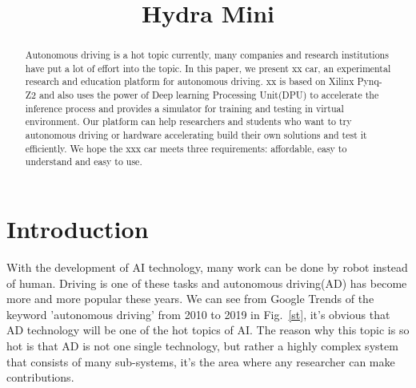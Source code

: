 \documentclass[conference]{IEEEtran}
\begin{document}
\begin{sloppypar}
\title{Hydra Mini}

\author{
}
\maketitle

\begin{abstract}
Autonomous driving is a hot topic currently, many companies and research institutions have put a lot of effort into the topic. In this paper, we present xx car, an experimental research and education platform for autonomous driving. xx is based on Xilinx Pynq-Z2 and also uses the power of Deep learning Processing Unit(DPU) to accelerate the inference process and provides a simulator for training and testing in virtual environment. Our platform can help researchers and students who want to try autonomous driving or hardware accelerating build their own solutions and test it efficiently. We hope the xxx car meets three requirements: affordable, easy to understand and easy to use. 
\end{abstract}


\section{Introduction}
With the development of AI technology, many work can be done by robot instead of human. Driving is one of these tasks and autonomous driving(AD) has become more and more popular these years. We can see from Google Trends of the keyword 'autonomous driving' from 2010 to 2019 in Fig.~\ref{st}, it's obvious that AD technology will be one of the hot topics of AI. The reason why this topic is so hot is that AD is not one single technology, but rather a highly complex system that consists of many sub-systems\cite{b1}, it's the area where any researcher can make contributions.


\end{sloppypar}
\end{document}
